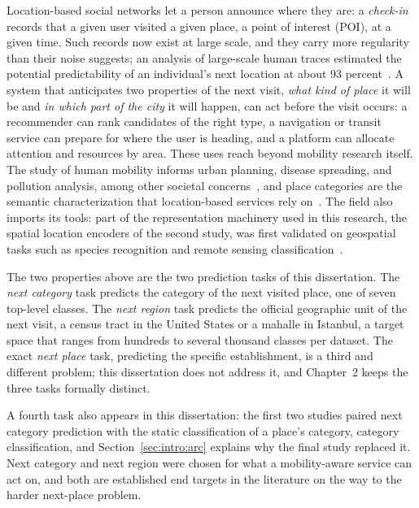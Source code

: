 Location-based social networks let a person announce where they are: a
\emph{check-in} records that a given user visited a given place, a point of interest
(POI), at a given time. Such records now exist at large scale, and they carry more
regularity than their noise suggests;
an analysis of large-scale human traces estimated the potential predictability of an
individual's next location at about 93 percent~\cite{song2010limits}. A system that
anticipates two properties of the next visit, \emph{what kind of place} it will be and
\emph{in which part of the city} it will happen, can act before the visit occurs: a
recommender can rank candidates of the right type, a navigation or transit service can
prepare for where the user is heading, and a platform can allocate attention and
resources by area. These uses reach beyond mobility research itself. The study of
human mobility informs urban planning, disease spreading, and pollution analysis,
among other societal concerns~\cite{luca2021mobilitysurvey}, and place categories are
the semantic characterization that location-based services rely on~\cite{Xu2023}. The
field also imports its tools: part of the representation machinery used in this
research, the spatial location encoders of the second study, was first validated on
geospatial tasks such as species recognition and remote sensing
classification~\cite{mai2023sphere2vec, wu2024torchspatial}.

The two properties above are the two prediction tasks of this dissertation. The
\emph{next category} task predicts the category of the next visited place, one of
seven top-level classes. The \emph{next region} task predicts the official geographic
unit of the next visit, a census tract in the United States or a mahalle in Istanbul,
a target space that ranges from hundreds to several thousand classes per dataset. The
exact \emph{next place} task, predicting the specific establishment, is a third and
different problem; this dissertation does not address it, and Chapter~2 keeps the
three tasks formally distinct.

A fourth task also appears in this dissertation: the first two studies paired next
category prediction with the static classification of a place's category, category
classification, and Section~\ref{sec:intro:arc} explains why the final study replaced
it. Next category and next region were chosen for what a mobility-aware service can
act on, and both are established end targets in the literature on the way to the
harder next-place problem.

